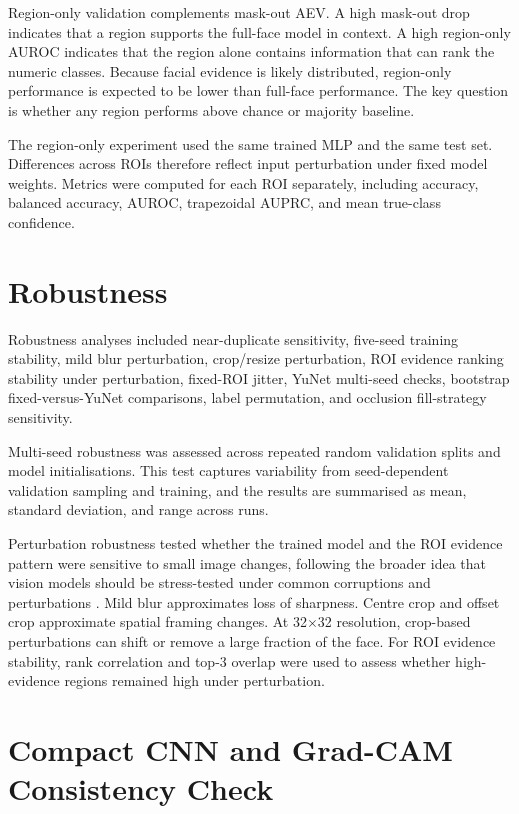 Region-only validation complements mask-out AEV. A high mask-out drop indicates that a region supports the full-face model in context. A high region-only AUROC indicates that the region alone contains information that can rank the numeric classes. Because facial evidence is likely distributed, region-only performance is expected to be lower than full-face performance. The key question is whether any region performs above chance or majority baseline.


The region-only experiment used the same trained MLP and the same test set. Differences across ROIs therefore reflect input perturbation under fixed model weights. Metrics were computed for each ROI separately, including accuracy, balanced accuracy, AUROC, trapezoidal AUPRC, and mean true-class confidence.


\section{Robustness}

Robustness analyses included near-duplicate sensitivity, five-seed training stability, mild blur perturbation, crop/resize perturbation, ROI evidence ranking stability under perturbation, fixed-ROI jitter, YuNet multi-seed checks, bootstrap fixed-versus-YuNet comparisons, label permutation, and occlusion fill-strategy sensitivity.


Multi-seed robustness was assessed across repeated random validation splits and model initialisations. This test captures variability from seed-dependent validation sampling and training, and the results are summarised as mean, standard deviation, and range across runs.


Perturbation robustness tested whether the trained model and the ROI evidence pattern were sensitive to small image changes, following the broader idea that vision models should be stress-tested under common corruptions and perturbations . Mild blur approximates loss of sharpness. Centre crop and offset crop approximate spatial framing changes. At 32$\times$32 resolution, crop-based perturbations can shift or remove a large fraction of the face. For ROI evidence stability, rank correlation and top-3 overlap were used to assess whether high-evidence regions remained high under perturbation.


\section{Compact CNN and Grad-CAM Consistency Check}

